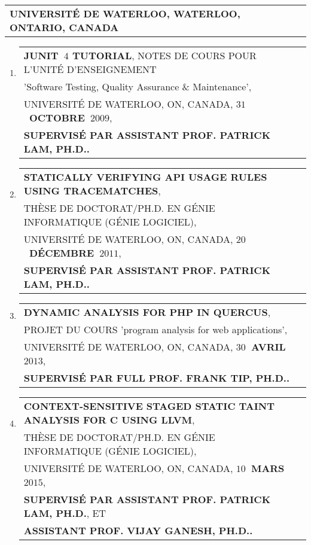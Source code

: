 \documentclass[9pt,a4paper]{article} %
\makeatletter
\newcommand{\headerrow}[2]
{\begin{tabular*}{\linewidth}{l@{\extracolsep{\fill}}r}
	#1 &
	#2 \\
\end{tabular*}}
\newcommand{\headerrowONE}[1]{\headerrow{#1}{}}
\makeatother
\begin{document}
\vspace{1em}

\headerrowONE{\textbf{UNIVERSITÉ DE WATERLOO, WATERLOO, ONTARIO, CANADA}}

\vspace{0.3em}

\begin{enumerate}
\item \headerrowONE{\textbf{JUNIT~$4$ TUTORIAL}, NOTES DE COURS POUR L'UNITÉ D'ENSEIGNEMENT \\
	'Software Testing, Quality Assurance \& Maintenance',\\
	UNIVERSITÉ DE WATERLOO, ON, CANADA, \textbf{$31$~OCTOBRE~$2009$},\\
	\textbf{SUPERVISÉ PAR ASSISTANT PROF. PATRICK LAM, PH.D..}}
 
\item \headerrowONE{\textbf{STATICALLY VERIFYING API USAGE RULES USING TRACEMATCHES},\\
	THÈSE DE DOCTORAT/PH.D. EN GÉNIE INFORMATIQUE (GÉNIE LOGICIEL),\\
	UNIVERSITÉ DE WATERLOO, ON, CANADA, \textbf{$20$~DÉCEMBRE~$2011$},\\
	\textbf{SUPERVISÉ PAR ASSISTANT PROF. PATRICK LAM, PH.D..}}

\item \headerrowONE{\textbf{DYNAMIC ANALYSIS FOR PHP IN QUERCUS},\\
	PROJET DU COURS 'program analysis for web applications',\\
	UNIVERSITÉ DE WATERLOO, ON, CANADA, \textbf{$30$~AVRIL~$2013$},\\
	\textbf{SUPERVISÉ PAR FULL PROF. FRANK TIP, PH.D..}}


\item \headerrowONE{\textbf{CONTEXT-SENSITIVE STAGED STATIC TAINT ANALYSIS FOR C USING LLVM},\\
	THÈSE DE DOCTORAT/PH.D. EN GÉNIE INFORMATIQUE (GÉNIE LOGICIEL),\\
	UNIVERSITÉ DE WATERLOO, ON, CANADA, \textbf{$10$~MARS~$2015$},\\
	\textbf{SUPERVISÉ PAR ASSISTANT PROF. PATRICK LAM, PH.D.}, ET\\
	\textbf{ASSISTANT PROF. VIJAY GANESH, PH.D..}}
\end{enumerate}
\end{document}
